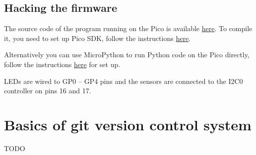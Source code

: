 \documentclass{article}
\begin{document}
\subsection{Hacking the firmware}
The source code of the program running on the Pico is available \href{https://bitbucket.org/emil_varga/picolab/src/master/}{here}. To compile it, you need to set up Pico SDK, follow the instructions \href{https://www.raspberrypi.com/documentation/microcontrollers/c_sdk.html}{here}.

Alternatively you can use MicroPython to run Python code on the Pico directly, follow the instructions \href{https://www.raspberrypi.com/documentation/microcontrollers/micropython.html#what-is-micropython}{here} for set up. 

LEDs are wired to GP0 -- GP4 pins and the sensors are connected to the I2C0 controller on pins 16 and 17.

\section{Basics of git version control system}
\label{sec:git}
TODO
\end{document}
